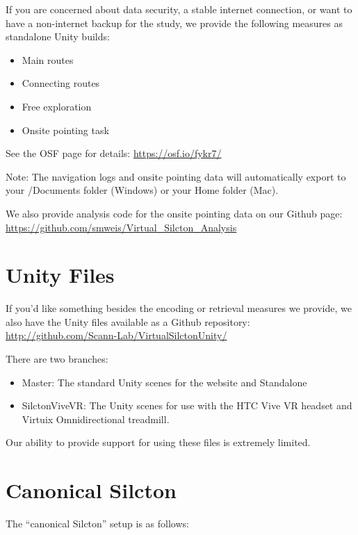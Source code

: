 \documentclass[
  12pt,
]{book}
\providecommand{\tightlist}{%
  \setlength{\itemsep}{0pt}\setlength{\parskip}{0pt}}
\begin{document}
If you are concerned about data security, a stable internet connection, or want to have a non-internet backup for the study, we provide the following measures as standalone Unity builds:

\begin{itemize}
\tightlist
\item
  Main routes
\item
  Connecting routes
\item
  Free exploration
\item
  Onsite pointing task
\end{itemize}

See the OSF page for details: \url{https://osf.io/fykr7/}

Note: The navigation logs and onsite pointing data will automatically export to your /Documents folder (Windows) or your Home folder (Mac).

We also provide analysis code for the onsite pointing data on our Github page: \url{https://github.com/smweis/Virtual_Silcton_Analysis}

\hypertarget{unity-files}{%
\section{Unity Files}\label{unity-files}}

If you'd like something besides the encoding or retrieval measures we provide, we also have the Unity files available as a Github repository: \url{http://github.com/Scann-Lab/VirtualSilctonUnity/}

There are two branches:

\begin{itemize}
\tightlist
\item
  Master: The standard Unity scenes for the website and Standalone
\item
  SilctonViveVR: The Unity scenes for use with the HTC Vive VR headset and Virtuix Omnidirectional treadmill.
\end{itemize}

Our ability to provide support for using these files is extremely limited.

\hypertarget{canonical-silcton}{%
\section{Canonical Silcton}\label{canonical-silcton}}

The ``canonical Silcton'' setup is as follows:
\end{document}
